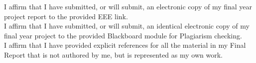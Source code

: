 \noindent I affirm that I have submitted, or will submit, an electronic copy of my final year project report to the provided EEE link. \\

\noindent I affirm that I have submitted, or will submit, an identical electronic copy of my final year project to the provided Blackboard module for Plagiarism checking. \\

\noindent I affirm that I have provided explicit references for all the material in my Final Report that is not authored by me, but is represented as my own work.
